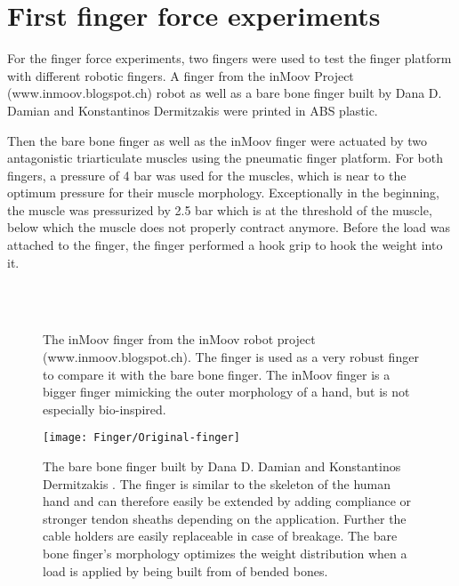 \documentclass[main]{subfiles}
\begin{document}
\section{First finger force experiments}

For the finger force experiments, two fingers were used to test the finger platform with different robotic fingers. A finger from the inMoov Project (www.inmoov.blogspot.ch) robot as well as a bare bone finger built by Dana D. Damian and Konstantinos Dermitzakis \cite{costas-hand} were printed in ABS plastic.

Then the bare bone finger as well as the inMoov finger were actuated by two antagonistic triarticulate muscles using the pneumatic finger platform. For both fingers, a pressure of 4 bar was used for the muscles, which is near to the optimum pressure for their muscle morphology. Exceptionally in the beginning, the muscle was pressurized by 2.5 bar which is at the threshold of the muscle, below which the muscle does not properly contract anymore. Before the load was attached to the finger, the finger performed a hook grip to hook the weight into it.

\begin{figure}[H]
\centering
{}\hspace{0.15\textwidth}
\\
\hspace{0.15\textwidth}
\\

\caption[inMoov hand and finger]{The inMoov finger from the inMoov robot project (www.inmoov.blogspot.ch). The finger is used as a very robust finger to compare it with the bare bone finger. The inMoov finger is a bigger finger mimicking the outer morphology of a hand, but is not especially bio-inspired.}
\label{inMoov-finger}
\end{figure}

\begin{figure}[H]
\centering
\texttt{[image: Finger/Original-finger]}

\caption[Bare bone finger]{The bare bone finger built by Dana D. Damian and Konstantinos Dermitzakis \cite{costas-hand}. The finger is similar to the skeleton of the human hand and can therefore easily be extended by adding compliance or stronger tendon sheaths depending on the application. Further the cable holders are easily replaceable in case of breakage. The bare bone finger's morphology optimizes the weight distribution when a load is applied by being built from of bended bones. }
\label{barebone-finger}
\end{figure}
\end{document}
